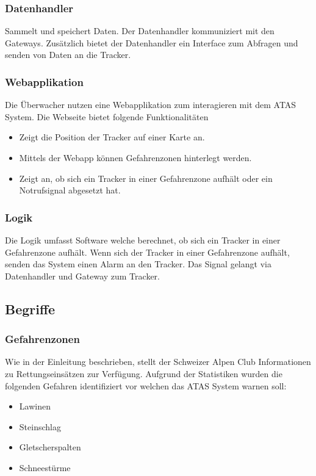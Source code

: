 \documentclass[11pt,english,german]{report}
\theoremstyle{definition}
\begin{document}
\subsubsection{Datenhandler}
Sammelt und speichert Daten. Der Datenhandler kommuniziert mit den Gateways. Zusätzlich bietet der Datenhandler ein Interface zum Abfragen und senden von Daten an die Tracker.

\subsubsection{Webapplikation}
Die Überwacher nutzen eine Webapplikation zum interagieren mit dem ATAS System. Die Webseite bietet folgende Funktionalitäten
\begin{itemize}
	\item
		Zeigt die Position der Tracker auf einer Karte an. 
	\item
		Mittels der Webapp können Gefahrenzonen hinterlegt werden.
	\item 
		Zeigt an, ob sich ein Tracker in einer Gefahrenzone aufhält oder ein Notrufsignal abgesetzt hat.	
\end{itemize}

\subsubsection{Logik}
Die Logik umfasst Software welche berechnet, ob sich ein Tracker in einer Gefahrenzone aufhält. Wenn sich der Tracker in einer Gefahrenzone aufhält, senden das System einen Alarm an den Tracker. Das Signal gelangt via Datenhandler und Gateway zum Tracker.

\subsection{Begriffe}
\subsubsection{Gefahrenzonen}
Wie in der Einleitung beschrieben, stellt der Schweizer Alpen Club Informationen zu Rettungseinsätzen zur Verfügung. Aufgrund der Statistiken wurden die folgenden Gefahren identifiziert vor welchen das ATAS System warnen soll:
\begin{itemize}
	\item Lawinen
	\item Steinschlag
	\item Gletscherspalten
	\item Schneestürme
\end{itemize}
\end{document}
